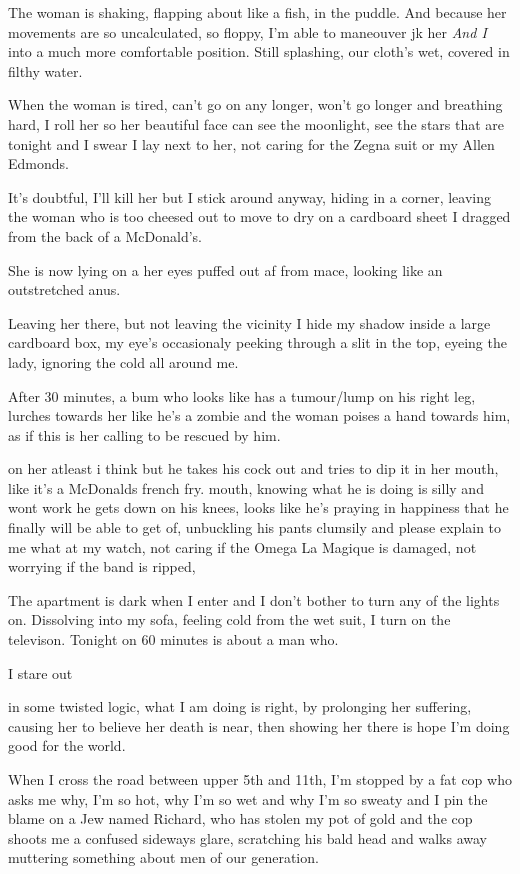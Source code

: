 \documentclass[19pt,openany]{book}
\begin{document}
The woman is shaking, flapping
about like a fish, in the puddle.
And  because her movements are so uncalculated,
so floppy, I'm able to maneouver jk
her	\textit{And I} into a much more comfortable
position. Still splashing, our
cloth's wet, covered in filthy
water.

When the woman is tired, can't
go on any longer, won't
go longer and breathing
hard, I roll her so her
beautiful face can see the moonlight,
see the stars that are tonight and I
swear I lay next to her, not caring
for the Zegna suit or my Allen
Edmonds.

It's doubtful, I'll kill her
but I stick around anyway, hiding
in a corner, leaving the woman
who is too cheesed out to move
to dry on a cardboard sheet I
dragged from the back of a McDonald's.

She is now lying on a
her eyes puffed out af
from mace, looking like an outstretched anus.

Leaving her there, but not leaving the vicinity
I hide my shadow inside a large cardboard box, my
eye's occasionaly peeking through a slit in the top,
eyeing the lady, ignoring the cold all around me.

After 30 minutes, a bum who looks like has a
tumour/lump on his right leg, lurches towards her
like he's a zombie and the woman poises a hand towards him, as if this is her calling to be rescued by him.

on her atleast i think but
he takes his cock out and tries
to dip it in her mouth,
like it's a McDonalds french fry.
mouth, knowing what he is
doing is silly and wont work he gets
down on his knees, looks like he's
praying in happiness that he finally
will be able to get of, unbuckling his
pants clumsily and
please explain to me what
at my watch,
not caring if the Omega
La Magique is damaged, not
worrying if the band is ripped,

The apartment
is dark when I enter and
I don't bother to turn
any of the lights on.
Dissolving into my sofa,
feeling cold from the
wet suit, I turn on
the televison. Tonight
on 60 minutes is about
a man who.

I stare out

in some twisted logic,
what I am doing is right,
by prolonging her suffering,
causing her to believe
her death is near, then showing
her there is hope I'm doing good for the world.

When I cross the road between
upper 5th and 11th,
I'm stopped by a fat cop who asks me why,
I'm so hot, why I'm so wet and why I'm so sweaty
and I pin the blame on a Jew named Richard,
who has stolen my pot of gold and the cop shoots me
a confused sideways glare, scratching his bald head
and walks away muttering something about men of our
generation.
\end{document}
